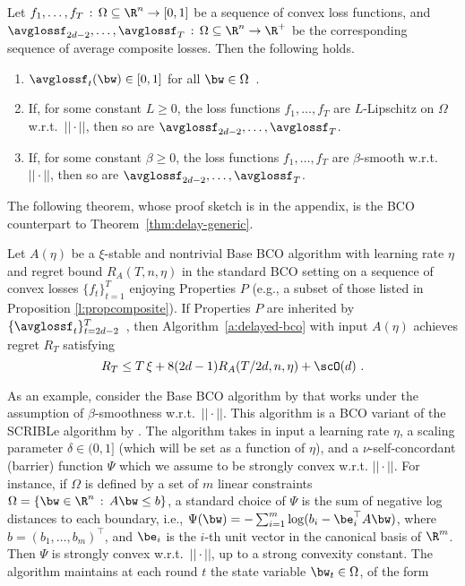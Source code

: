 \begin{proposition}\label{l:propcomposite}
Let $f_1,\ldots, f_T\,:\,\Omega \subseteq \R^n \to [0,1]$ be a sequence of convex loss functions, and $\avglossf_{2d-2}, \ldots, \avglossf_T \,:\,\Omega \subseteq \R^n \to \R^+$ be the corresponding sequence of average composite losses. Then the following holds.
\begin{enumerate}
\item
$
\avglossf_{t}(\bw) \in [0,1]
$ for all $\bw \in \Omega$~.
\item If, for some constant $L \geq 0$, the loss functions $f_1,\ldots, f_T$ are $L$-Lipschitz on $\Omega$ w.r.t.\ $||\cdot||$, then so are $\avglossf_{2d-2},\ldots, \avglossf_T$.
\item If, for some constant $\beta \geq 0$, the loss functions $f_1,\ldots, f_T$ are $\beta$-smooth w.r.t.\ $||\cdot||$, then so are $\avglossf_{2d-2},\ldots, \avglossf_T$.
\end{enumerate}
\end{proposition}
%
The following theorem, whose proof sketch is in the appendix, is the BCO counterpart to Theorem~\ref{thm:delay-generic}. 
%
\begin{theorem}\label{thm:convex}
Let $A(\eta)$ be a $\xi$-stable and nontrivial Base BCO algorithm with learning rate $\eta$ and regret bound
$R_A(T,n,\eta)$ in the standard BCO setting on a sequence of convex losses $\{f_t\}_{t=1}^T$ enjoying Properties $P$ (e.g., a subset of those listed in Proposition \ref{l:propcomposite}). If Properties $P$ are inherited by $\{\avglossf_t\}_{t=2d-2}^T$~, then Algorithm~\ref{a:delayed-bco} with input $A(\eta)$ achieves regret $R_T$ satisfying
\[
R_T 
\le 
T\,\xi + 8(2d-1)R_A(T/2d,n,\eta)+\scO(d)~.
\]
\end{theorem}
%
%
As an example, consider the Base BCO algorithm by \citet{st11} that works under the assumption of $\beta$-smoothness w.r.t.\ $||\cdot||$. This algorithm is a BCO variant of the SCRIBLe algorithm by \citet{ahr12}. The algorithm takes in input a learning rate $\eta$, a scaling parameter $\delta \in (0,1]$ 
(which will be set as a function of $\eta$), and a $\nu$-self-concordant (barrier) function $\Psi$ which we assume to be strongly convex w.r.t. $||\cdot||$. For instance, if $\Omega$ is defined by a set of $m$ linear constraints $\Omega = \{\bw \in \R^n\,:\, A\bw \leq b \}$, a standard choice of $\Psi$ is the sum of negative log distances to each boundary, i.e., $\Psi(\bw) = -\sum_{i=1}^m \log(b_i - \be_i^\top A\bw)$, where $b = (b_1,\ldots, b_m)^\top$, and $\be_i$ is the $i$-th unit vector in the canonical basis of $\R^m$. Then $\Psi$ is strongly convex w.r.t.\ $||\cdot||$, up to a strong convexity constant. The algorithm maintains at each round $t$ the state variable $\bw_t \in \Omega$, of the form
